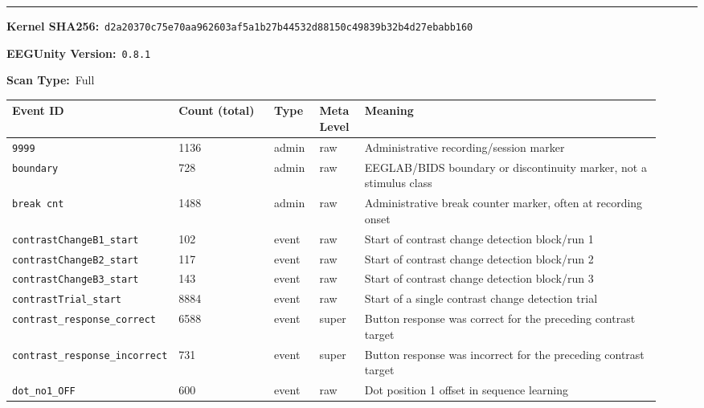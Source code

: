 {\begin{tcolorbox}
\noindent\rule{\linewidth}{0.4pt}\par\nopagebreak
{}\par\smallskip
{\scriptsize
\noindent\textbf{Kernel SHA256:}~\texttt{d2a20370c75e70aa962603af5a1b27b44532d88150c49839b32b4d27ebabb160}\par\smallskip
\noindent\textbf{EEGUnity Version:}~\texttt{0.8.1}\par\smallskip
\noindent\textbf{Scan Type:}~Full\par\smallskip
}
\smallskip{}\par\smallskip
\begingroup\scriptsize\setlength{\tabcolsep}{2pt}
\begin{tabular}{@{}p{0.1567\linewidth}p{0.1567\linewidth}p{0.0783\linewidth}p{0.0783\linewidth}p{0.4700\linewidth}@{}}
\toprule
\textbf{Event ID} & \textbf{Count (total)} & \textbf{Type} & \textbf{Meta Level} & \textbf{Meaning} \\
\midrule
\texttt{9999} & 1136 & admin & raw & Administrative recording/session marker \\
\texttt{boundary} & 728 & admin & raw & EEGLAB/BIDS boundary or discontinuity marker, not a stimulus class \\
\texttt{break cnt} & 1488 & admin & raw & Administrative break counter marker, often at recording onset \\
\texttt{contrastChangeB1\_\allowbreak{}start} & 102 & event & raw & Start of contrast change detection block/run 1 \\
\texttt{contrastChangeB2\_\allowbreak{}start} & 117 & event & raw & Start of contrast change detection block/run 2 \\
\texttt{contrastChangeB3\_\allowbreak{}start} & 143 & event & raw & Start of contrast change detection block/run 3 \\
\texttt{contrastTrial\_\allowbreak{}start} & 8884 & event & raw & Start of a single contrast change detection trial \\
\texttt{contrast\_\allowbreak{}response\_\allowbreak{}correct} & 6588 & event & super & Button response was correct for the preceding contrast target \\
\texttt{contrast\_\allowbreak{}response\_\allowbreak{}incorrect} & 731 & event & super & Button response was incorrect for the preceding contrast target \\
\texttt{dot\_\allowbreak{}no1\_\allowbreak{}OFF} & 600 & event & raw & Dot position 1 offset in sequence learning \\

\end{tabular}
\end{tcolorbox}}
